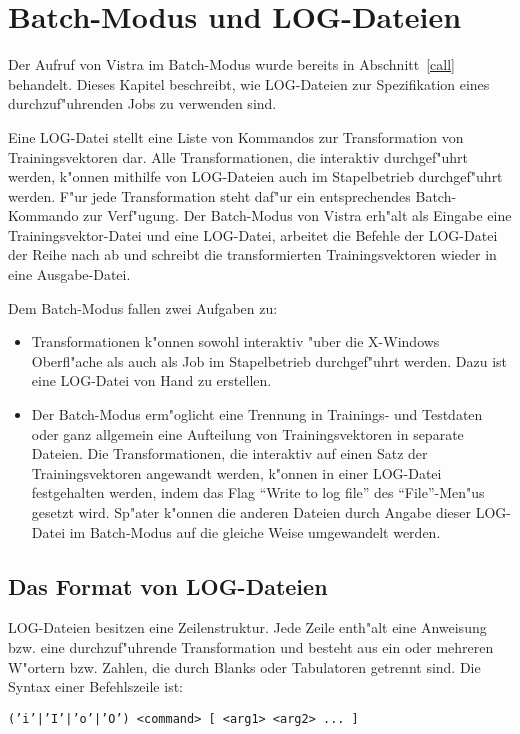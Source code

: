 \section{Batch-Modus und LOG-Dateien}
\label{log}

Der Aufruf von Vistra im Batch-Modus wurde bereits in Abschnitt~\ref{call}
behandelt.
Dieses Kapitel beschreibt, wie LOG-Dateien zur Spezifikation eines 
durchzuf"uhrenden Jobs zu verwenden sind.

Eine LOG-Datei stellt eine Liste von Kommandos zur Transformation
von Trainingsvektoren dar.
Alle Transformationen, die interaktiv durchgef"uhrt werden, k"onnen 
mithilfe von LOG-Dateien auch im Stapelbetrieb durchgef"uhrt werden.
F"ur jede Transformation steht daf"ur ein entsprechendes Batch-Kommando
zur Verf"ugung.
Der Batch-Modus von Vistra erh"alt als Eingabe eine Trainingsvektor-Datei
und eine LOG-Datei, arbeitet die Befehle der LOG-Datei der Reihe nach
ab und schreibt die transformierten Trainingsvektoren wieder in eine
Ausgabe-Datei.  

Dem Batch-Modus fallen zwei Aufgaben zu:
\begin{itemize}
\item Transformationen k"onnen sowohl interaktiv "uber die X-Windows 
Oberfl"ache als auch als Job im Stapelbetrieb durchgef"uhrt werden.
Dazu ist eine LOG-Datei von Hand zu erstellen.
\item Der Batch-Modus erm"oglicht eine Trennung in
Trainings- und Testdaten oder ganz allgemein eine Aufteilung von
Trainingsvektoren in separate Dateien.
Die Transformationen, die interaktiv auf einen Satz der Trainingsvektoren 
angewandt werden, k"onnen in einer LOG-Datei festgehalten
werden, indem das Flag "`Write to log file"' des "`File"'-Men"us
gesetzt wird.
Sp"ater k"onnen die anderen Dateien durch Angabe dieser LOG-Datei 
im Batch-Modus auf die gleiche Weise umgewandelt werden.
\end{itemize}  
   
\subsection{Das Format von LOG-Dateien}

LOG-Dateien besitzen eine Zeilenstruktur.
Jede Zeile enth"alt eine Anweisung bzw. eine durchzuf"uhrende 
Transformation und besteht
aus ein oder mehreren W"ortern bzw. Zahlen, die
durch Blanks oder Tabulatoren getrennt sind.
Die Syntax einer Befehlszeile ist:

{\tt ('i'|'I'|'o'|'O') <command> [ <arg1> <arg2> ... ]}  

